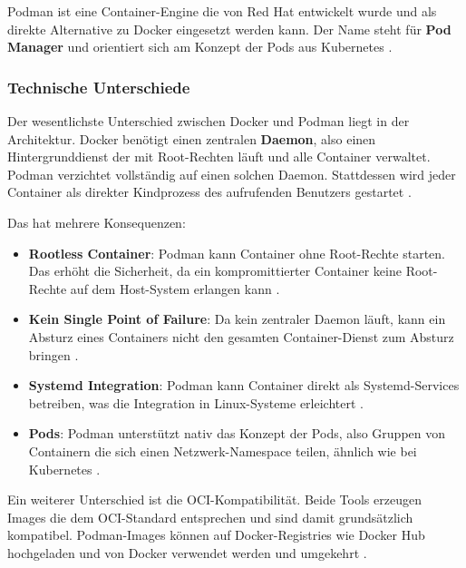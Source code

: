 Podman ist eine Container-Engine die von Red Hat entwickelt wurde 
und als direkte Alternative zu Docker eingesetzt werden kann. 
Der Name steht für \textbf{Pod Manager} und orientiert sich 
am Konzept der Pods aus Kubernetes \cite{podman_docs}.

\subsubsection{Technische Unterschiede}

Der wesentlichste Unterschied zwischen Docker und Podman liegt 
in der Architektur. Docker benötigt einen zentralen 
\textbf{Daemon}, also einen Hintergrunddienst der mit 
Root-Rechten läuft und alle Container verwaltet. Podman 
verzichtet vollständig auf einen solchen Daemon. Stattdessen 
wird jeder Container als direkter Kindprozess des aufrufenden 
Benutzers gestartet \cite{podman_docs}.

Das hat mehrere Konsequenzen:

\begin{itemize}
    \item \textbf{Rootless Container}: Podman kann Container 
    ohne Root-Rechte starten. Das erhöht die Sicherheit, da 
    ein kompromittierter Container keine Root-Rechte auf dem 
    Host-System erlangen kann \cite{redhat_podman}.

    \item \textbf{Kein Single Point of Failure}: Da kein 
    zentraler Daemon läuft, kann ein Absturz eines Containers 
    nicht den gesamten Container-Dienst zum Absturz bringen 
    \cite{podman_docs}.

    \item \textbf{Systemd Integration}: Podman kann Container 
    direkt als Systemd-Services betreiben, was die Integration 
    in Linux-Systeme erleichtert \cite{redhat_podman}.

    \item \textbf{Pods}: Podman unterstützt nativ das Konzept 
    der Pods, also Gruppen von Containern die sich einen 
    Netzwerk-Namespace teilen, ähnlich wie bei Kubernetes 
    \cite{podman_docs}.
\end{itemize}

Ein weiterer Unterschied ist die OCI-Kompatibilität. Beide 
Tools erzeugen Images die dem OCI-Standard entsprechen und 
sind damit grundsätzlich kompatibel. Podman-Images können 
auf Docker-Registries wie Docker Hub hochgeladen und von 
Docker verwendet werden und umgekehrt \cite{redhat_podman}.

